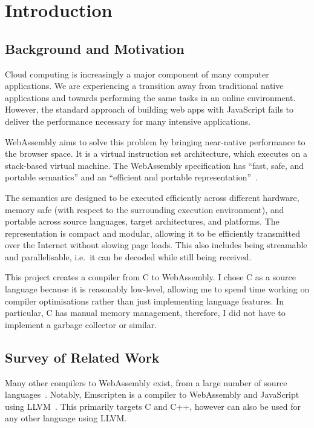 \documentclass[00-main.tex]{subfiles}
\begin{document}
\chapter{Introduction}

\section{Background and Motivation}

Cloud computing is increasingly a major component of many computer applications.
We are experiencing a transition away from traditional native applications and towards performing the same tasks in an online environment.
However, the standard approach of building web apps with JavaScript fails to deliver the performance necessary for many intensive applications.

WebAssembly aims to solve this problem by bringing near-native performance to the browser space.
It is a virtual instruction set architecture, which executes on a stack-based virtual machine.
The WebAssembly specification has ``fast, safe, and portable semantics'' and an ``efficient and portable representation''~.

The semantics are designed to be executed efficiently across different hardware, memory safe (with respect to the surrounding execution environment), and portable across source languages, target architectures, and platforms.
The representation is compact and modular, allowing it to be efficiently transmitted over the Internet without slowing page loads.
This also includes being streamable and parallelisable, i.e.~it can be decoded while still being received.

This project creates a compiler from C to WebAssembly.
I chose C as a source language because it is reasonably low-level, allowing me to spend time working on compiler optimisations rather than just implementing language features.
In particular, C has manual memory management, therefore, I did not have to implement a garbage collector or similar.


\section{Survey of Related Work}

Many other compilers to WebAssembly exist, from a large number of source languages~.
Notably, Emscripten is a compiler to WebAssembly and JavaScript using LLVM~.
This primarily targets C and C++, however can also be used for any other language using LLVM\@.
\end{document}
